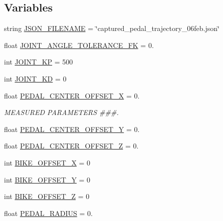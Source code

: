 \subsection*{Variables}
\begin{DoxyCompactItemize}
\item 
string \mbox{\hyperlink{namespacecapture__pedal__trajectory_ad1d5add611204b12043a126abb98492c}{J\+S\+O\+N\+\_\+\+F\+I\+L\+E\+N\+A\+ME}} = \char`\"{}captured\+\_\+pedal\+\_\+trajectory\+\_\+06feb.\+json\char`\"{}
\item 
float \mbox{\hyperlink{namespacecapture__pedal__trajectory_ab099221b0d5408d71443d0ec46c934dd}{J\+O\+I\+N\+T\+\_\+\+A\+N\+G\+L\+E\+\_\+\+T\+O\+L\+E\+R\+A\+N\+C\+E\+\_\+\+FK}} = 0.
\item 
int \mbox{\hyperlink{namespacecapture__pedal__trajectory_a17f32ce02010543add42596faff74a22}{J\+O\+I\+N\+T\+\_\+\+KP}} = 500
\item 
int \mbox{\hyperlink{namespacecapture__pedal__trajectory_aafb2017b021edc06d1500bcb8965fed9}{J\+O\+I\+N\+T\+\_\+\+KD}} = 0
\item 
float \mbox{\hyperlink{namespacecapture__pedal__trajectory_a3d0288c92be21566c30d330ec9b04ddf}{P\+E\+D\+A\+L\+\_\+\+C\+E\+N\+T\+E\+R\+\_\+\+O\+F\+F\+S\+E\+T\+\_\+X}} = 0.
\begin{DoxyCompactList}\small\item\em M\+E\+A\+S\+U\+R\+ED P\+A\+R\+A\+M\+E\+T\+E\+RS \#\#\#. \end{DoxyCompactList}\item 
float \mbox{\hyperlink{namespacecapture__pedal__trajectory_ad3b6cdad0edebb959ecdb76e709876f4}{P\+E\+D\+A\+L\+\_\+\+C\+E\+N\+T\+E\+R\+\_\+\+O\+F\+F\+S\+E\+T\+\_\+Y}} = 0.
\item 
float \mbox{\hyperlink{namespacecapture__pedal__trajectory_adecb66f79b8a878ce63c441bbd250b0e}{P\+E\+D\+A\+L\+\_\+\+C\+E\+N\+T\+E\+R\+\_\+\+O\+F\+F\+S\+E\+T\+\_\+Z}} = 0.
\item 
int \mbox{\hyperlink{namespacecapture__pedal__trajectory_a1b49dec5499551d0e71e6ab97ff29212}{B\+I\+K\+E\+\_\+\+O\+F\+F\+S\+E\+T\+\_\+X}} = 0
\item 
int \mbox{\hyperlink{namespacecapture__pedal__trajectory_a475c3dee13003f3ece2d10e85edb1f83}{B\+I\+K\+E\+\_\+\+O\+F\+F\+S\+E\+T\+\_\+Y}} = 0
\item 
int \mbox{\hyperlink{namespacecapture__pedal__trajectory_ae56ea6a6121fd586046b998e9cb04733}{B\+I\+K\+E\+\_\+\+O\+F\+F\+S\+E\+T\+\_\+Z}} = 0
\item 
float \mbox{\hyperlink{namespacecapture__pedal__trajectory_a4a76a55d0312e30b5da43583ce1f53ea}{P\+E\+D\+A\+L\+\_\+\+R\+A\+D\+I\+US}} = 0.

\end{DoxyCompactItemize}
